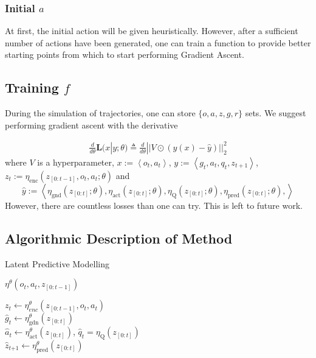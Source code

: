 \documentclass[]{article}
\begin{document}
\subsubsection{Initial $a$}

At first, the initial action will be given heuristically. However, after a sufficient number of actions have been generated, one can train a function to provide better starting points from which to start performing Gradient Ascent.


\subsection{Training $f$}

During the simulation of trajectories, one can store $\{o, a, z, g, r\}$ sets. We suggest performing gradient ascent with the derivative

\begin{align}
\frac{d}{d \theta} \boldsymbol{L}(x | y ; \theta)
\triangleq
\frac{d}{d \theta}  || V \odot (y(x) - \hat{y} )||^2_2
\end{align} 
where $V$ is a hyperparameter, $x := \left<o_t, a_t\right>$, $y := \left<g_t, a_t, q_t, z_{t+1}\right>$,  $z_t := \eta_{\text{enc}}(z_{[0:t-1]}, o_t, a_t ; \theta)$ and $$\hat{y} := \left<\eta_{\text{gnd}}(z_{[0:t]} ; \theta), \eta_{\text{act}}(z_{[0:t]} ; \theta), \eta_{\text{Q}}(z_{[0:t]} ; \theta), \eta_{\text{pred}}(z_{[0:t]};\theta), \right>$$
However, there are countless losses than one can try. This is left to future work. 
\newpage
\subsection{Algorithmic Description of Method}
\begin{algorithm}[H]
\caption{Latent Predictive Modelling}
\end{algorithm}

\begin{algorithm}[H]
\caption{$\eta^\theta(o_t, a_t, z_{[0:t-1]})$}
$z_t \leftarrow \eta^\theta_{enc}(z_{[0:t-1]}, o_t, a_t)$ \\
$\hat{g}_t \leftarrow \eta^\theta_{\text{gdn}}(z_{[0:t]})$\\
$\hat{a}_t \leftarrow \eta^\theta_{\text{act}}(z_{[0:t]})$, $\hat{q}_t = \eta_{\text{Q}}(z_{[0:t]})$\\
$\hat{z}_{t \boldsymbol{+}1} \leftarrow \eta^\theta_{\text{pred}}(z_{[0:t]})$\\
\end{algorithm}
\end{document}
